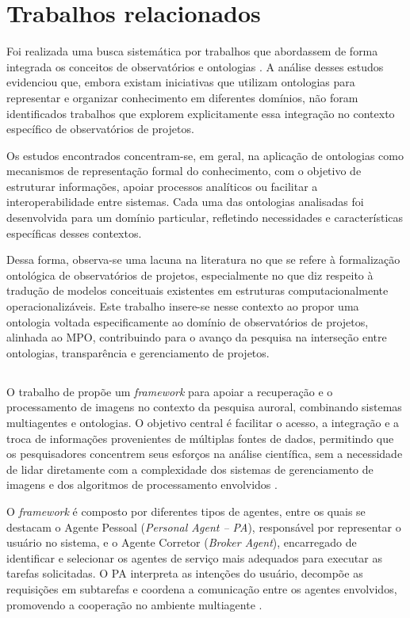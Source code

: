\section{Trabalhos relacionados}
Foi realizada uma busca sistemática por trabalhos que abordassem de forma integrada os conceitos de observatórios e ontologias \cite{chen2008apply, fox2009ontology, masmoudi2018ontology, yoshiura2018towards}. A análise desses estudos evidenciou que, embora existam iniciativas que utilizam ontologias para representar e organizar conhecimento em diferentes domínios, não foram identificados trabalhos que explorem explicitamente essa integração no contexto específico de observatórios de projetos.

Os estudos encontrados concentram-se, em geral, na aplicação de ontologias como mecanismos de representação formal do conhecimento, com o objetivo de estruturar informações, apoiar processos analíticos ou facilitar a interoperabilidade entre sistemas. Cada uma das ontologias analisadas foi desenvolvida para um domínio particular, refletindo necessidades e características específicas desses contextos.

Dessa forma, observa-se uma lacuna na literatura no que se refere à formalização ontológica de observatórios de projetos, especialmente no que diz respeito à tradução de modelos conceituais existentes em estruturas computacionalmente operacionalizáveis. Este trabalho insere-se nesse contexto ao propor uma ontologia voltada especificamente ao domínio de observatórios de projetos, alinhada ao MPO, contribuindo para o avanço da pesquisa na interseção entre ontologias, transparência e gerenciamento de projetos.

\subsection{\texorpdfstring{\citeauthor{chen2008apply}}{Chen}}
O trabalho de \citeauthor{chen2008apply} propõe um \textit{framework} para apoiar a recuperação e o processamento de imagens no contexto da pesquisa auroral, combinando sistemas multiagentes e ontologias. O objetivo central é facilitar o acesso, a integração e a troca de informações provenientes de múltiplas fontes de dados, permitindo que os pesquisadores concentrem seus esforços na análise científica, sem a necessidade de lidar diretamente com a complexidade dos sistemas de gerenciamento de imagens e dos algoritmos de processamento envolvidos \cite{chen2008apply}.

O \textit{framework} é composto por diferentes tipos de agentes, entre os quais se destacam o Agente Pessoal (\textit{Personal Agent – PA}), responsável por representar o usuário no sistema, e o Agente Corretor (\textit{Broker Agent}), encarregado de identificar e selecionar os agentes de serviço mais adequados para executar as tarefas solicitadas. O PA interpreta as intenções do usuário, decompõe as requisições em subtarefas e coordena a comunicação entre os agentes envolvidos, promovendo a cooperação no ambiente multiagente \cite{chen2008apply}.

